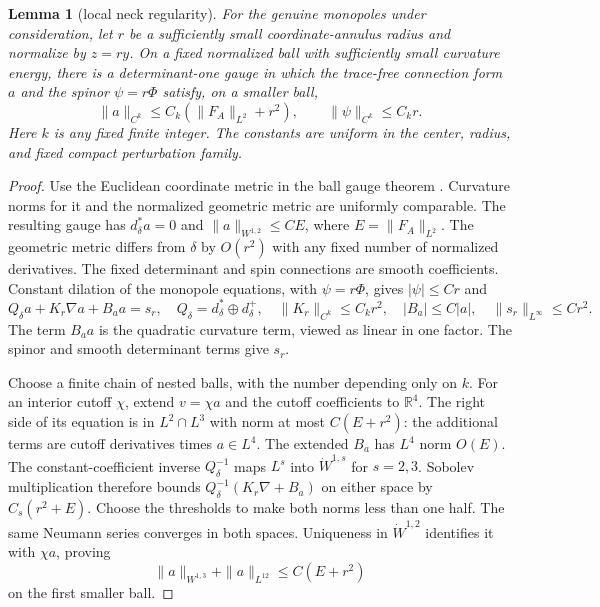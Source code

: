 \documentclass[11pt]{amsart}
\newtheorem{lemma}[theorem]{Lemma}
\theoremstyle{definition}
\theoremstyle{remark}
\theoremstyle{plain}
\newcommand{\RR}{\mathbb{R}}
\begin{document}
\begin{lemma}[local neck regularity]\label{lem:neck-local-regularity}
For the genuine monopoles under consideration, let $r$ be a sufficiently
small coordinate-annulus radius and normalize by $z=ry$.
On a fixed normalized ball with sufficiently small curvature energy,
there is a determinant-one gauge in which the trace-free connection
form $a$ and the spinor $\psi=r\Phi$ satisfy, on a smaller ball,
\begin{equation}\label{eq:neck-local-regularity}
 \|a\|_{C^k}\le C_k(\|F_A\|_{L^2}+r^2),\qquad
 \|\psi\|_{C^k}\le C_k r.
\end{equation}
Here $k$ is any fixed finite integer.  The constants are uniform in
the center, radius, and fixed compact perturbation family.
\end{lemma}
\begin{proof}
Use the Euclidean coordinate metric in the ball gauge theorem
\cite[Theorem~2.1]{Uhlenbeck82}.  Curvature norms for it and the
normalized geometric metric are uniformly comparable.  The resulting
gauge has $d_\delta^*a=0$ and
$\|a\|_{W^{1,2}}\le CE$, where $E=\|F_A\|_{L^2}$.
The geometric metric differs from $\delta$ by $O(r^2)$ with any fixed
number of normalized derivatives.  The fixed determinant and spin
connections are smooth coefficients.  Constant dilation of the
monopole equations, with $\psi=r\Phi$, gives $|\psi|\le Cr$ and
\begin{equation}\label{eq:neck-bootstrap-equation}
 Q_\delta a+K_r\nabla a+B_a a=s_r,
 \quad Q_\delta=d_\delta^*\oplus d_\delta^+,
 \quad \|K_r\|_{C^k}\le C_k r^2,
 \quad |B_a|\le C|a|,
 \quad \|s_r\|_{L^\infty}\le Cr^2.
\end{equation}
The term $B_a a$ is the quadratic curvature term, viewed as linear
in one factor.  The spinor and smooth determinant terms give $s_r$.

Choose a finite chain of nested balls, with the number depending only
on $k$.  For an interior cutoff $\chi$, extend $v=\chi a$ and the
cutoff coefficients to $\RR^4$.  The right side of its equation is in
$L^2\cap L^3$ with norm at most $C(E+r^2)$: the additional terms
are cutoff derivatives times $a\in L^4$.  The extended $B_a$ has
$L^4$ norm $O(E)$.  The constant-coefficient inverse $Q_\delta^{-1}$
maps $L^s$ into $\dot W^{1,s}$ for $s=2,3$.  Sobolev multiplication
therefore bounds
$Q_\delta^{-1}(K_r\nabla+B_a)$ on either space by $C_s(r^2+E)$.
Choose the thresholds to make both norms less than one half.
The same Neumann series converges in both spaces.  Uniqueness in
$\dot W^{1,2}$ identifies it with $\chi a$, proving
\[
 \|a\|_{W^{1,3}}+\|a\|_{L^{12}}\le C(E+r^2)
\]
on the first smaller ball.


\end{proof}
\end{document}
